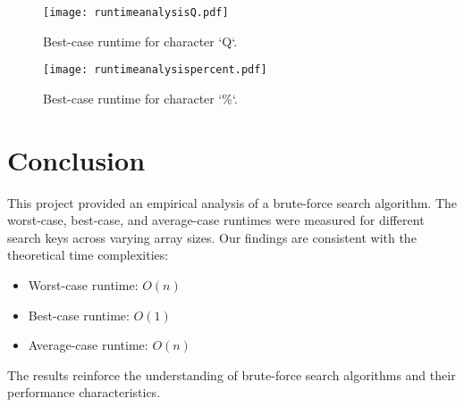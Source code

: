 \documentclass{article}
\begin{document}
	\begin{figure}[H]
		\centering
		\texttt{[image: runtimeanalysisQ.pdf]}
		\caption{Best-case runtime for character `Q`.}
	\end{figure}
	
	\begin{figure}[H]
		\centering
		\texttt{[image: runtimeanalysispercent.pdf]}
		\caption{Best-case runtime for character `\%`.}
	\end{figure}
	
	\newpage
	
	\section{Conclusion}
	This project provided an empirical analysis of a brute-force search algorithm. The worst-case, best-case, and average-case runtimes were measured for different search keys across varying array sizes. Our findings are consistent with the theoretical time complexities:
	
	\begin{itemize}
		\item Worst-case runtime: \( O(n) \)
		\item Best-case runtime: \( O(1) \)
		\item Average-case runtime: \( O(n) \)
	\end{itemize}
	
	The results reinforce the understanding of brute-force search algorithms and their performance characteristics.
	
\end{document}
